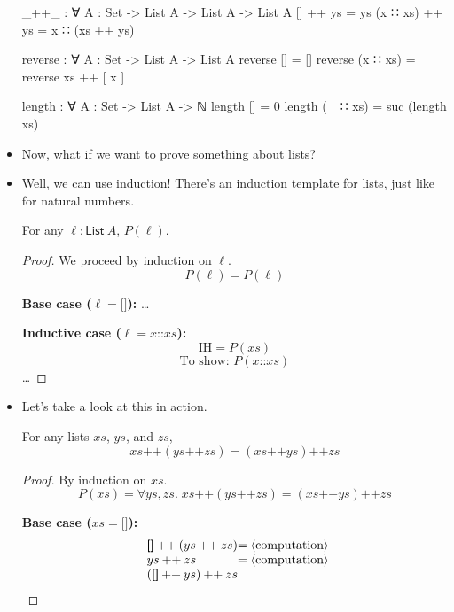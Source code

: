 \documentclass{lecturenotes}
\newcommand{\nil}{\ensuremath{\textsf{[]}}}
\newcommand{\cons}{\ensuremath{\mathbin{\textsf{::}}}}
\newcommand{\app}{\ensuremath{\mathbin{\textsf{++}}}}
\begin{document}
\begin{itemize}
\begin{code}
_++_ : ∀ {A : Set} -> List A -> List A -> List A
[] ++ ys = ys
(x ∷ xs) ++ ys = x ∷ (xs ++ ys)

reverse : ∀ {A : Set} -> List A -> List A
reverse [] = []
reverse (x ∷ xs) = reverse xs ++ [ x ]

length : ∀ {A : Set} -> List A -> ℕ
length [] = 0
length (_ ∷ xs) = suc (length xs)
\end{code}

\item Now, what if we want to prove something about lists?
\item Well, we can use induction! There's an induction template for lists, just like for natural numbers.

  \begin{thm}
    For any $\ell \colon \textsf{List}~A$, $P(\ell)$.
  \end{thm}
  \begin{proof}
    We proceed by induction on $\ell$.
    $$P(\ell) = P(\ell)$$

    \noindent\textbf{Base case ($\ell = \nil$):} \dots

    \noindent\textbf{Inductive case ($\ell = x \cons xs$):}
    $$\text{IH} = P(xs)$$
    $$\text{To show: } P(x \cons xs)$$
    \dots
  \end{proof}
\item Let's take a look at this in action.
  \begin{thm}
    For any lists $xs$, $ys$, and $zs$, $$xs \app (ys \app zs) = (xs \app ys) \app zs$$
  \end{thm}
  \begin{proof}
    By induction on $xs$.
    $$P(xs) = \forall ys, zs.\; xs \app (ys \app zs) = (xs \app ys) \app zs$$

    \noindent\textbf{Base case ($xs = \nil$):}
    $$\begin{array}{l@{=\langle} l@{\rangle}}
      \nil \app (ys \app zs) & \text{computation}\\
      ys \app zs & \text{computation}\\
      \multicolumn{2}{l}{(\nil \app ys) \app zs}
    \end{array}$$


\end{proof}
\end{itemize}
\end{document}
